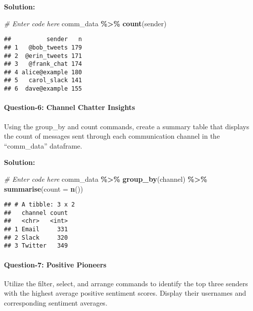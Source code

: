 \documentclass[
]{article}
\newenvironment{Shaded}{\begin{snugshade}}{\end{snugshade}}
\newcommand{\AttributeTok}[1]{\textcolor[rgb]{0.13,0.29,0.53}{#1}}
\newcommand{\CommentTok}[1]{\textcolor[rgb]{0.56,0.35,0.01}{\textit{#1}}}
\newcommand{\FunctionTok}[1]{\textcolor[rgb]{0.13,0.29,0.53}{\textbf{#1}}}
\newcommand{\NormalTok}[1]{#1}
\newcommand{\SpecialCharTok}[1]{\textcolor[rgb]{0.81,0.36,0.00}{\textbf{#1}}}
\begin{document}
\textbf{Solution:}

\begin{Shaded}
\begin{Highlighting}[]
\CommentTok{\# Enter code here}
\NormalTok{comm\_data }\SpecialCharTok{\%\textgreater{}\%} \FunctionTok{count}\NormalTok{(sender)}
\end{Highlighting}
\end{Shaded}

\begin{verbatim}
##          sender   n
## 1   @bob_tweets 179
## 2  @erin_tweets 171
## 3   @frank_chat 174
## 4 alice@example 180
## 5   carol_slack 141
## 6  dave@example 155
\end{verbatim}

\hypertarget{question-6-channel-chatter-insights}{%
\paragraph{Question-6: Channel Chatter
Insights}\label{question-6-channel-chatter-insights}}

Using the group\_by and count commands, create a summary table that
displays the count of messages sent through each communication channel
in the ``comm\_data'' dataframe.

\textbf{Solution:}

\begin{Shaded}
\begin{Highlighting}[]
\CommentTok{\# Enter code here}
\NormalTok{comm\_data }\SpecialCharTok{\%\textgreater{}\%} \FunctionTok{group\_by}\NormalTok{(channel) }\SpecialCharTok{\%\textgreater{}\%}
  \FunctionTok{summarise}\NormalTok{(}\AttributeTok{count =} \FunctionTok{n}\NormalTok{())}
\end{Highlighting}
\end{Shaded}

\begin{verbatim}
## # A tibble: 3 x 2
##   channel count
##   <chr>   <int>
## 1 Email     331
## 2 Slack     320
## 3 Twitter   349
\end{verbatim}

\hypertarget{question-7-positive-pioneers}{%
\paragraph{Question-7: Positive
Pioneers}\label{question-7-positive-pioneers}}

Utilize the filter, select, and arrange commands to identify the top
three senders with the highest average positive sentiment scores.
Display their usernames and corresponding sentiment averages.
\end{document}
